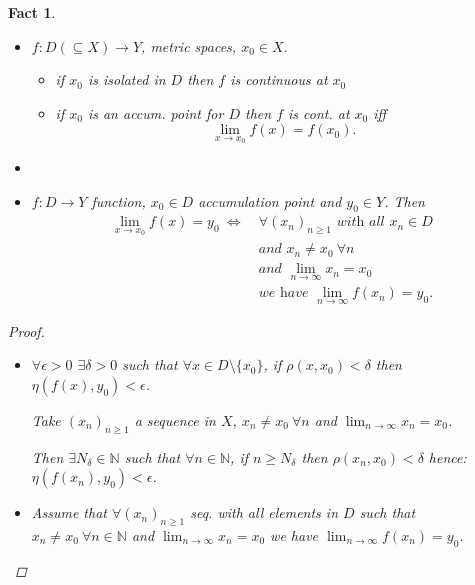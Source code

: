 \documentclass[12pt]{amsbook}
\newtheorem{fact}[theorem]{Fact}
\theoremstyle{definition}
\newcommand{\NN}{{\mathbb N}}
\newcommand{\Ra}{\Rightarrow} %
\newcommand{\La}{\Leftarrow} %
\newcommand{\Lra}{\Leftrightarrow} %
\newcommand{\ra}{\rightarrow} %
\begin{document}
\begin{fact} \
\begin{itemize}
\item[(1)] $f: D \left(\subseteq X\right) \ra Y$, metric spaces, $x_0 \in X$. %
    \begin{itemize}
    \item[(i)] if $x_0$ is isolated in $D$ then $f$ is continuous at $x_0$
    \item[(ii)] if $x_0$ is an accum. point for $D$ then $f$ is cont. at $x_0$ iff \begin{equation*}\lim_{x \ra x_0} f(x) = f(x_0).\end{equation*}
    \end{itemize}
\item[(2)] %
\item[(3)] $f: D \ra Y$ function, $x_0 \in D$ accumulation point and $y_0 \in Y$. Then
    \begin{align}
    \lim_{x \ra x_0} f(x) = y_0 \ \Lra \ \nonumber
    & \forall (x_n)_{n \geq 1} \textit{ with all } x_n \in D \\ \nonumber
    & \textit{and } x_n \neq x_0 \ \forall n \\ \nonumber
    & \textit{and } \lim_{n \ra \infty} x_n = x_0 \\ \nonumber
    & \textit{we have } \lim_{n \ra \infty} f(x_n) = y_0.
    \end{align}
    \end{itemize}
    
    \begin{proof}
    
    \begin{itemize}
    \item["$\Ra$"] $\forall \epsilon > 0$ $\exists \delta > 0$ such that $\forall x \in D \setminus \{x_0\}$, if $\rho(x, x_0) < \delta$ then $\eta(f(x), y_0) < \epsilon$.
    
    Take $(x_n)_{n \geq 1}$ a sequence in $X$, $x_n \neq x_0 \ \forall n$ and $\lim_{n \ra \infty} x_n = x_0$.
    
    Then $\exists N_\delta \in \NN$ such that $\forall n \in \NN$, if $n \geq N_\delta$ then $\rho(x_n, x_0) < \delta$ hence: $\eta(f(x_n), y_0) < \epsilon$.
    
    
    \item["$\La$"] Assume that $\forall (x_n)_{n \geq 1}$ seq. with all elements in $D$ such that $x_n \neq x_0 \ \forall n \in \NN$
    and $\lim_{n \ra \infty} x_n = x_0$ we have $\lim_{n \ra \infty} f(x_n) = y_0$.
    

\end{itemize}
\end{proof}
\end{fact}
\end{document}
